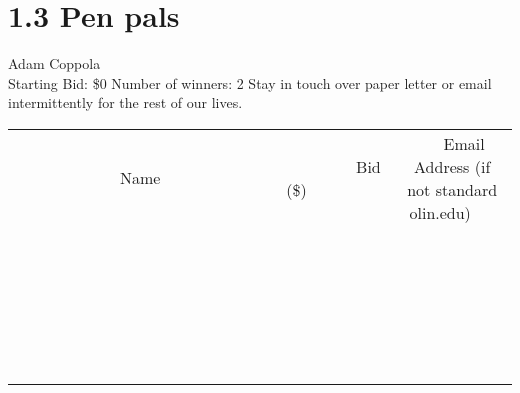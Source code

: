\documentclass[11pt]{article}
\begin{document}
\section*{1.3 Pen pals}
Adam Coppola
\\
Starting Bid: \$0
\newline
Number of winners: 2
\newline
Stay in touch over paper letter or email intermittently for the rest of our lives.
\\[6ex]
\begin{tabular}{c c c}
~~~~~~~~~~~~~Name~~~~~~~~~~~~~ & ~~~~~~~~~Bid (\$)~~~~~~~~~  & ~~~Email Address (if not standard olin.edu)~~~\\
 & & \\
\hline
 & & \\
\hline
 & & \\
\hline
 & & \\
\hline
 & & \\
\hline
 & & \\
\hline
 & & \\
\hline
 & & \\
\hline
 & & \\
\hline
 & & \\
\hline
 & & \\
\hline
 & & \\
\hline
 & & \\
\hline
 & & \\
\hline
 & & \\
\hline
 & & \\
\hline
 & & \\
\hline
 & & \\
\hline
 & & \\
\hline
 & & \\
\hline
 & & \\
\hline
 & & \\
\hline
 & & \\
\hline
 & & \\
\hline
 & & \\
\hline
 & & \\
\hline
\end{tabular}
\newpage
\end{document}
